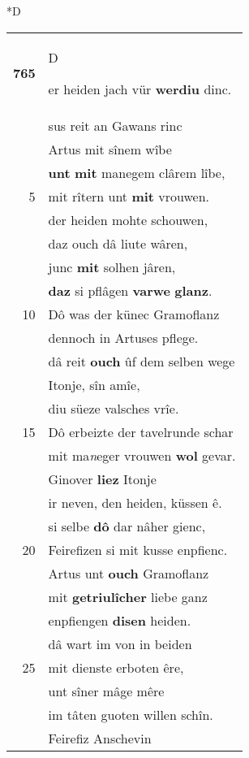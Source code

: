 \documentclass[8pt,a4paper,notitlepage]{article}
\begin{document}
\begin{table}[ht]
\begin{minipage}[t]{0.5\linewidth}
\small
\begin{center}*D
\end{center}
\begin{tabular}{rl}
\textbf{765} & \begin{large}D\end{large}er heiden jach vür \textbf{werdiu} dinc.\\ 
 & sus reit an Gawans rinc\\ 
 & Artus mit sînem wîbe\\ 
 & \textbf{unt} \textbf{mit} manegem clârem lîbe,\\ 
5 & mit rîtern unt \textbf{mit} vrouwen.\\ 
 & der heiden mohte schouwen,\\ 
 & daz ouch dâ liute wâren,\\ 
 & junc \textbf{mit} solhen jâren,\\ 
 & \textbf{daz} si pflâgen \textbf{varwe} \textbf{glanz}.\\ 
10 & Dô was der künec Gramoflanz\\ 
 & dennoch in Artuses pflege.\\ 
 & dâ reit \textbf{ouch} ûf dem selben wege\\ 
 & Itonje, sîn amîe,\\ 
 & diu süeze valsches vrîe.\\ 
15 & Dô erbeizte der tavelrunde schar\\ 
 & mit ma\textit{n}eger vrouwen \textbf{wol} gevar.\\ 
 & Ginover \textbf{liez} Itonje\\ 
 & ir neven, den heiden, küssen ê.\\ 
 & si selbe \textbf{dô} dar nâher gienc,\\ 
20 & Feirefizen si mit kusse enpfienc.\\ 
 & Artus unt \textbf{ouch} Gramoflanz\\ 
 & mit \textbf{getriulîcher} liebe ganz\\ 
 & enpfiengen \textbf{disen} heiden.\\ 
 & dâ wart im von in beiden\\ 
25 & mit dienste erboten êre,\\ 
 & unt sîner mâge mêre\\ 
 & im tâten guoten willen schîn.\\ 
 & Feirefiz Anschevin\\ 

\end{tabular}
\end{minipage}
\end{table}
\end{document}

